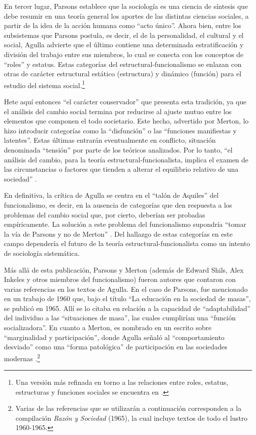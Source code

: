 En tercer lugar, Parsons establece que la sociología es una ciencia de síntesis que debe resumir en una teoría general los aportes de las distintas ciencias sociales, a partir de la idea de la acción humana como \enquote{acto único}. Ahora bien, entre los subsistemas que Parsons postula, es decir, el de la personalidad, el cultural y el social, Agulla advierte que el último contiene una determinada estratificación y división del trabajo entre sus miembros, lo cual se conecta con los conceptos de \enquote{roles} y estatus. Estas categorías del estructural-funcionalismo se enlazan con otras de carácter estructural estático (estructura) y dinámico (función) para el estudio del sistema social.\footnote{Una versión más refinada en torno a las relaciones entre roles, estatus, estructuras y funciones sociales se encuentra en \textcite{1635-AGULLA1964}.}

Hete aquí entonces \enquote{el carácter conservador} \parencite[109]{1640-AGULLA1962} que presenta esta tradición, ya que el análisis del cambio social termina por reducirse al ajuste mutuo entre los elementos que componen el todo societario. Este hecho, advertido por Merton, lo hizo introducir categorías como la \enquote{disfunción} o las \enquote{funciones manifiestas y latentes}. Estas últimas entrarán eventualmente en conflicto, situación denominada \enquote{tensión} por parte de los teóricos analizados. Por lo tanto, \enquote{el análisis del cambio, para la teoría estructural-funcionalista, implica el examen de las circunstancias o factores que tienden a alterar el equilibrio relativo de una sociedad} \parencite[131]{1640-AGULLA1962}.

En definitiva, la crítica de Agulla se centra en el \enquote{talón de Aquiles} del funcionalismo, es decir, en la ausencia de categorías que den respuesta a los problemas del cambio social que, por cierto, deberían ser probadas empíricamente. La solución a este problema del funcionalismo supondría \enquote{tomar la vía de Parsons y no de Merton} \parencite[158]{1640-AGULLA1962}. Del hallazgo de estas categorías en este campo dependería el futuro de la teoría estructural-funcionalista como un intento de sociología sistemática.

Más allá de esta publicación, Parsons y Merton (además de Edward Shils, Alex Inkeles y otros miembros del funcionalismo) fueron autores que contaron con varias referencias en los textos de Agulla. En el caso de Parsons, fue mencionado en un trabajo de 1960 que, bajo el título \enquote{La educación en la sociedad de masas}, se publicó en 1965. Allí se lo citaba en relación a la capacidad de \enquote{adaptabilidad} del individuo a las \enquote{situaciones de masa}, las cuales cumplirían una \enquote{función socializadora}. En cuanto a Merton, es nombrado en un escrito sobre \enquote{marginalidad y participación}, donde Agulla señaló al \enquote{comportamiento desviado} como una \enquote{forma patológica} de participación en las sociedades modernas \parencite{1641-AGULLA1965}.\footnote{Varias de las referencias que se utilizarán a continuación corresponden a la compilación \emph{Razón y Sociedad} (1965), la cual incluye textos de todo el lustro 1960-1965.}

